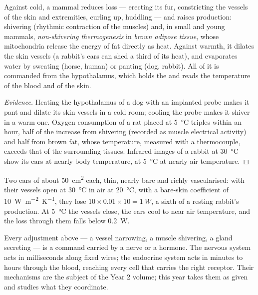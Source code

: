 \begin{proposition}\label{prop:b1:mammal-organization:thermoreg}
Against cold, a mammal reduces loss --- erecting its fur, constricting
the vessels of the skin and extremities, curling up, huddling --- and
raises production: shivering (rhythmic contraction of the muscles) and,
in small and young mammals, \emph{non-shivering
thermogenesis} in \emph{brown adipose
tissue}, whose mitochondria release the
energy of fat directly as heat. Against warmth, it dilates the skin
vessels (a rabbit's ears can shed a third of its heat), and evaporates
water by sweating (horse, human) or panting (dog, rabbit). All of it is
commanded from the hypothalamus, which holds the  and reads the
temperature of the blood and of the skin.
\end{proposition}
\begin{proof}[Evidence]
Heating the hypothalamus of a dog with an implanted probe makes it
pant and dilate its skin vessels in a cold room; cooling the probe makes
it shiver in a warm one. Oxygen consumption of a rat placed at
\qty{5}{\celsius} triples within an hour, half of the increase from
shivering (recorded as muscle electrical activity) and half from brown
fat, whose temperature, measured with a thermocouple, exceeds that of
the surrounding tissues. Infrared images of a rabbit at
\qty{30}{\celsius} show its ears at nearly body temperature, at
\qty{5}{\celsius} at nearly air temperature.
\end{proof}

\begin{example}\label{ex:b1:mammal-organization:ears}
Two ears of about \qty{50}{cm^2} each, thin, nearly bare and richly
vascularised: with their vessels open at \qty{30}{\celsius} in air at
\qty{20}{\celsius}, with a bare-skin coefficient of
\qty{10}{W.m^{-2}.K^{-1}}, they lose $10\times 0.01\times 10 =
\qty{1}{W}$, a sixth of a resting rabbit's production. At
\qty{5}{\celsius} the vessels close, the ears cool to near air
temperature, and the loss through them falls below \qty{0.2}{W}.
\end{example}

\begin{remark}[Coordination]\label{rem:b1:mammal-organization:coordination}
Every adjustment above --- a vessel narrowing, a muscle shivering, a
gland secreting --- is a command carried by a nerve or a hormone. The
nervous system acts in milliseconds along fixed wires; the endocrine
system acts in minutes to hours through the blood, reaching every cell
that carries the right receptor. Their mechanisms are the subject of
the Year 2 volume; this year takes them as given and studies what they
coordinate.
\end{remark}

